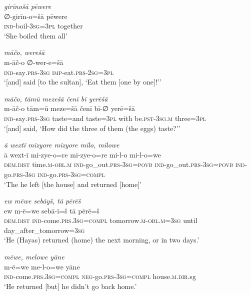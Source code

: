 \ea \label{ŽH.93}
\textit{girīnošā pēwere} \\ 
\gll ∅-girīn-o=šā pēwere \\ 
 \textsc{ind-}boil\textsc{-3sg}\textsc{=3pl} together \\ 
\glt `She boiled them all'
\z 
 
\ea \label{ŽH.94}
\textit{māčo, werešā} \\ 
\gll m-āč-o ∅-wer-e=šā \\ 
 \textsc{ind-}say\textsc{.prs}\textsc{-3sg} \textsc{imp-}eat\textsc{.prs}-\textsc{2sg}\textsc{=3pl} \\ 
\glt `[and] said [to the sultan], ‘Eat them [one by one]!’'
\z 
 
\ea \label{ŽH.97}
\textit{māčo, tāmū mezešā čenī bī yerēšā} \\ 
\gll m-āč-o tām=ū meze=šā čenī bī-∅ yerē=šā \\ 
 \textsc{ind-}say\textsc{.prs}\textsc{-3sg} taste=and taste\textsc{=3pl} with be\textsc{.pst}\textsc{-3sg}\textsc{.m} three\textsc{=3pl} \\ 
\glt `[and] said, ‘How did the three of them (the eggs) taste?’'
\z 
 
\ea \label{ŽH.106}
\textit{ā wextī mizyore mizyore milo, milowe} \\ 
\gll ā wext-ī mi-zye-o=re mi-zye-o=re mi-l-o mi-l-o=we \\ 
 \textsc{dem.dist} time\textsc{.m}\textsc{-obl}\textsc{.m} \textsc{ind-}go\_out\textsc{.prs}\textsc{-3sg}\textsc{=\textsc{povb}} \textsc{ind-}go\_out\textsc{.prs}\textsc{-3sg}\textsc{=\textsc{povb}} \textsc{ind-}go\textsc{.prs}\textsc{-3sg} \textsc{ind-}go\textsc{.prs}\textsc{-3sg}\textsc{=compl} \\ 
\glt `The he left [the house] and returned [home]'
\z 
 
\ea \label{ŽH.107}
\textit{ew mēwe sebāyš, tā pērēš} \\ 
\gll ew m-ē=we sebā-ī=š tā pērē=š \\ 
 \textsc{dem.dist} \textsc{ind-}come\textsc{.prs}\textsc{.3sg}\textsc{=compl} tomorrow\textsc{.m}\textsc{-obl}\textsc{.m}\textsc{=3sg} until day\_after\_tomorrow\textsc{=3sg} \\ 
\glt `He (Hayas) returned (home) the next morning, or in two days.'
\z 
 
\ea \label{ŽH.108}
\textit{mēwe, melowe yāne} \\ 
\gll m-ē=we me-l-o=we yāne \\ 
 \textsc{ind-}come\textsc{.prs}\textsc{.3sg}\textsc{=compl} \textsc{neg-}go\textsc{.prs}\textsc{-3sg}\textsc{=compl} house\textsc{.m}\textsc{.dir}.sg \\ 
\glt `He returned [but] he didn’t go back home.'
\z 
 
